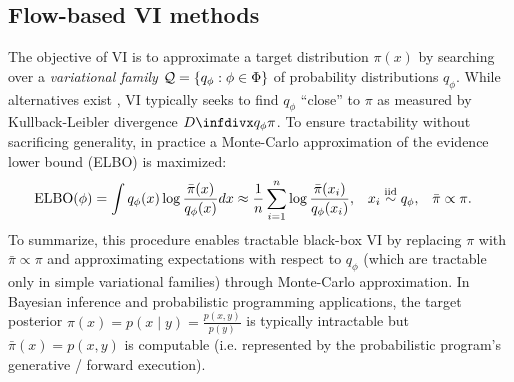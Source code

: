 \documentclass{article}
\theoremstyle{definition}
\theoremstyle{remark}
\begin{document}

\vspace{-2mm}
\subsection{Flow-based VI methods} 

The objective of VI is to approximate a target distribution $\pi(x)$ by searching over
a \emph{variational family} $\mathcal{Q} = \{q_\phi : \phi \in \Phi\}$ of probability distributions $q_\phi$.
While alternatives exist \citep{li2016variational,wang2018variational}, VI typically
seeks to find $q_\phi$ ``close'' to $\pi$ as measured by Kullback-Leibler divergence $\infdiv{q_\phi}{\pi}$.
To ensure tractability without sacrificing generality, in practice \citep{wingate2013automated,ranganath2014black}
a Monte-Carlo approximation of the evidence lower bound (ELBO) is maximized:
\begin{align*}
  \text{ELBO}(\phi)
  = \int q_\phi(x) \log \frac{\bar\pi(x)}{q_\phi(x)} dx
   & \approx \frac{1}{n} \sum_{i=1}^n \log \frac{\bar\pi(x_i)}{q_\phi(x_i)},
   && x_i \overset{\text{iid}}{\sim} q_\phi,
   && \bar{\pi} \propto \pi  .
\end{align*}
To summarize, this procedure enables tractable black-box VI
by replacing $\pi$ with $\bar\pi \propto \pi$ and approximating expectations with respect to $q_\phi$ (which are tractable only in simple variational families) through Monte-Carlo approximation. In Bayesian inference and probabilistic programming applications, the target posterior
$\pi(x) = p(x \mid y) = \frac{p(x, y)}{p(y)}$ is typically intractable but
$\bar\pi(x) = p(x,y)$ is computable (i.e. represented by the probabilistic program's
generative / forward execution).
\end{document}
